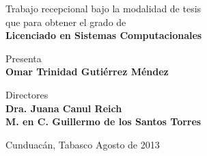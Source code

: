 {{\begin{minipage}[th]{0.89\textwidth}
    Trabajo recepcional bajo la modalidad de tesis \\
    que para obtener el grado de\\[\baselineskip] 
    
    {\bfseries{\Large Licenciado en Sistemas Computacionales}}\\
    \vspace*{2\baselineskip} \vfill

    Presenta\\[\baselineskip]
    
    {\bfseries{\Large Omar Trinidad Gutiérrez Méndez}}\\
    \vspace*{2\baselineskip} \vfill
    
    Directores\\[\baselineskip]
    
    {\bfseries{\Large Dra. Juana Canul Reich}}\\
    {\bfseries{\Large M. en C. Guillermo de los Santos Torres}}\\
    \vspace*{2\baselineskip} \vfill

    Cunduacán, Tabasco \hfill Agosto de 2013
    \end{minipage}

} %

\newpage 
\thispagestyle{empty}
\mbox{}

{\selectfont

    \newpage
    \thispagestyle{empty}

    \setcounter{page}{3}

}}
